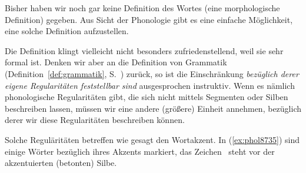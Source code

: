 Bisher haben wir noch gar keine Definition des Wortes (\zB eine morphologische Definition) gegeben.
Aus Sicht der Phonologie gibt es eine einfache Möglichkeit, eine solche Definition aufzustellen. 


Die Definition klingt vielleicht nicht besonders zufriedenstellend, weil sie sehr formal ist.
Denken wir aber an die Definition von Grammatik (Definition~\ref{def:grammatik}, S.~\pageref{def:grammatik}) zurück, so ist die Einschränkung \textit{bezüglich derer eigene Regularitäten feststellbar sind} ausgesprochen instruktiv.
Wenn es nämlich phonologische Regularitäten gibt, die sich nicht mittels Segmenten oder Silben beschreiben lassen, müssen wir eine andere (größere) Einheit annehmen, bezüglich derer wir diese Regularitäten beschreiben können.

Solche Reguläritäten betreffen wie gesagt den Wortakzent.
In (\ref{ex:phol8735}) sind einige Wörter bezüglich ihres Akzents markiert, das Zeichen \Akz\ steht vor der akzentuierten (betonten) Silbe.

\begin{exe}
  \ex\label{ex:phol8735}
  \begin{xlist}
  \end{xlist}
\end{exe}

